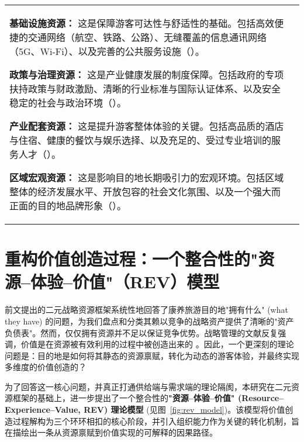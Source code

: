\documentclass[UTF8, 12pt, a4paper, twoside]{ctexart}
\begin{document}
\begin{longtable}{>{\bfseries}p{} >{\raggedright\arraybackslash}p{}}
\begin{tabitemize}
		\item \textbf{基础设施资源：} 这是保障游客可达性与舒适性的基础。包括高效便捷的交通网络（航空、铁路、公路）、无缝覆盖的信息通讯网络（5G、Wi-Fi）、以及完善的公共服务设施（\parencite{baghaei2020strategies, khazaee-pool2024comprehensive, karadayi-usta2024sustainable}）。
		\item \textbf{政策与治理资源：} 这是产业健康发展的制度保障。包括政府的专项扶持政策与财政激励、清晰的行业标准与国际认证体系、以及安全稳定的社会与政治环境（\parencite{uygun2022evaluation, seo2018policies, pocock2011medical, du2024medical}）。
		\item \textbf{产业配套资源：} 这是提升游客整体体验的关键。包括高品质的酒店与住宿、健康的餐饮与娱乐选择、以及充足的、受过专业培训的服务人才（\parencite{phuthong2022developing, abbaspour2022designing, cham2020brand}）。
		\item \textbf{区域宏观资源：} 这是影响目的地长期吸引力的宏观环境。包括区域整体的经济发展水平、开放包容的社会文化氛围、以及一个强大而正面的目的地品牌形象（\parencite{li2022empirical, moreno-gonzalez2020health, fetscherin2016medical}）。
	\end{tabitemize}
	\\
\end{longtable}


\section{重构价值创造过程：一个整合性的"资源--体验--价值"（REV）模型}

前文提出的二元战略资源框架系统性地回答了康养旅游目的地"拥有什么" (what they have) 的问题，为我们盘点和分类其赖以竞争的战略资产提供了清晰的"资产负债表"。然而，仅仅拥有资源并不足以保证竞争优势。战略管理的文献反复强调，价值是在资源被有效利用的过程中被创造出来的 \parencite{barney1991firm}。因此，一个更深刻的理论问题是：目的地是如何将其静态的资源禀赋，转化为动态的游客体验，并最终实现多维度的价值创造的？

为了回答这一核心问题，并真正打通供给端与需求端的理论隔阂，本研究在二元资源框架的基础上，进一步提出了一个整合性的\textbf{"资源--体验--价值" (Resource--Experience--Value, REV) 理论模型} (见图~\ref{fig:rev_model})。该模型将价值创造过程解构为三个环环相扣的核心阶段，并引入组织能力作为关键的转化机制，旨在描绘出一条从资源禀赋到价值实现的可解释的因果路径。
\end{document}
